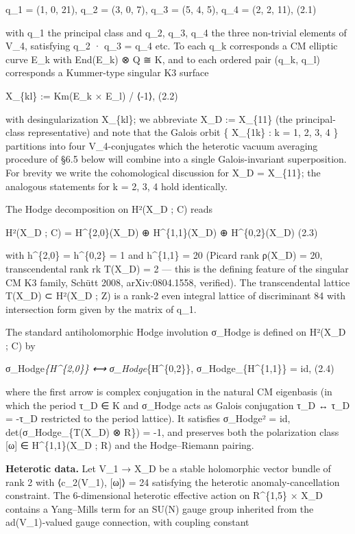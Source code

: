 \documentclass[
 11pt,
 a4paper,
]{article}
\begin{document}
q\_1 = (1, 0, 21), q\_2 = (3, 0, 7), q\_3 = (5, 4, 5), q\_4 = (2, 2, 11), (2.1)

with q\_1 the principal class and q\_2, q\_3, q\_4 the three non-trivial elements of V\_4, satisfying q\_2 · q\_3 = q\_4 etc. To each q\_k corresponds a CM elliptic curve E\_k with End(E\_k) ⊗ Q ≅ K, and to each ordered pair (q\_k, q\_l) corresponds a Kummer-type singular K3 surface

X\_\{kl\} := Km(E\_k × E\_l) / ⟨-1⟩, (2.2)

with desingularization X\_\{kl\}; we abbreviate X\_D := X\_\{11\} (the principal-class representative) and note that the Galois orbit \{ X\_\{1k\} : k = 1, 2, 3, 4 \} partitions into four V\_4-conjugates which the heterotic vacuum averaging procedure of §6.5 below will combine into a single Galois-invariant superposition. For brevity we write the cohomological discussion for X\_D = X\_\{11\}; the analogous statements for k = 2, 3, 4 hold identically.

The Hodge decomposition on H²(X\_D ; C) reads

H²(X\_D ; C) = H\^{}\{2,0\}(X\_D) ⊕ H\^{}\{1,1\}(X\_D) ⊕ H\^{}\{0,2\}(X\_D) (2.3)

with h\^{}\{2,0\} = h\^{}\{0,2\} = 1 and h\^{}\{1,1\} = 20 (Picard rank ρ(X\_D) = 20, transcendental rank rk T(X\_D) = 2 --- this is the defining feature of the singular CM K3 family, Schütt 2008, arXiv:0804.1558, verified). The transcendental lattice T(X\_D) ⊂ H²(X\_D ; Z) is a rank-2 even integral lattice of discriminant 84 with intersection form given by the matrix of q\_1.

The standard antiholomorphic Hodge involution σ\_Hodge is defined on H²(X\_D ; C) by

σ\_Hodge\textbar{}\emph{\{H\^{}\{2,0\}\} ⟷ σ\_Hodge\textbar{}}\{H\^{}\{0,2\}\}, σ\_Hodge\textbar\_\{H\^{}\{1,1\}\} = id, (2.4)

where the first arrow is complex conjugation in the natural CM eigenbasis (in which the period τ\_D ∈ K and σ\_Hodge acts as Galois conjugation τ\_D ↔ τ\_D = -τ\_D restricted to the period lattice). It satisfies σ\_Hodge² = id, det(σ\_Hodge\textbar\_\{T(X\_D) ⊗ R\}) = -1, and preserves both the polarization class {[}ω{]} ∈ H\^{}\{1,1\}(X\_D ; R) and the Hodge--Riemann pairing.

\textbf{Heterotic data.} Let V\_1 → X\_D be a stable holomorphic vector bundle of rank 2 with ⟨c\_2(V\_1), {[}ω{]}⟩ = 24 satisfying the heterotic anomaly-cancellation constraint. The 6-dimensional heterotic effective action on R\^{}\{1,5\} × X\_D contains a Yang--Mills term for an SU(N) gauge group inherited from the ad(V\_1)-valued gauge connection, with coupling constant
\end{document}
